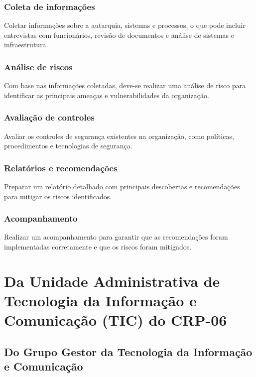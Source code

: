 \documentclass[openright, twoside, a4paper]{memoir}
\begin{document}
\subsection{Coleta de
informações}

Coletar informações sobre a autarquia, sistemas e processos, o que pode
incluir entrevistas com funcionários, revisão de documentos e análise de
sistemas e infraestrutura.

\subsection{Análise de riscos}

Com base nas informações coletadas, deve-se realizar uma análise de
risco para identificar as principais ameaças e vulnerabilidades da
organização.

\subsection{Avaliação de
controles}

Avaliar os controles de segurança existentes na organização, como
políticas, procedimentos e tecnologias de segurança.

\subsection{Relatórios e
recomendações}

Preparar um relatório detalhado com principais descobertas e
recomendações para mitigar os riscos identificados.

\subsection{Acompanhamento}

Realizar um acompanhamento para garantir que as recomendações foram
implementadas corretamente e que os riscos foram mitigados.
\clearpage
\clearpage\chapter{Da Unidade Administrativa de Tecnologia da Informação e
Comunicação (TIC) do
CRP-06}

\section{Do Grupo Gestor da Tecnologia da Informação e
Comunicação}
\end{document}
